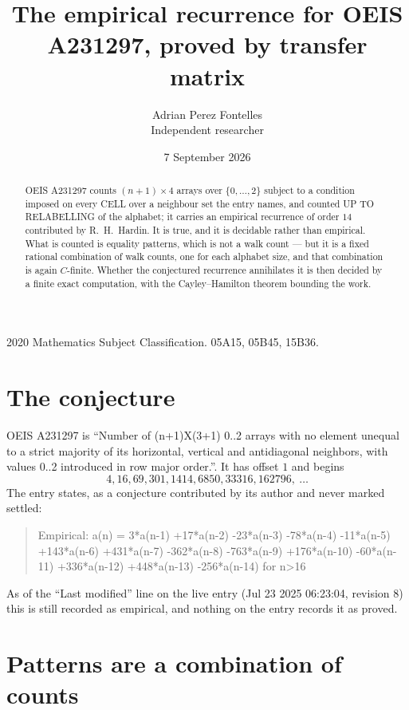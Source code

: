 \documentclass[11pt,a4paper]{article}
\title{The empirical recurrence for OEIS A231297, proved by transfer matrix}
\author{Adrian Perez Fontelles\\ \small Independent researcher}
\date{7 September 2026}
\theoremstyle{plain}
\theoremstyle{definition}
\begin{document}
\maketitle

\begin{abstract}
OEIS A231297 counts $(n+1)\times4$ arrays over $\{0,\dots,2\}$ subject to a condition imposed on
every CELL over a neighbour set the entry names, and counted UP TO RELABELLING of the
alphabet; it carries an empirical recurrence of order $14$ contributed by
R.~H.~Hardin. It is true, and it is decidable rather than empirical. What is counted is
equality patterns, which is not a walk count --- but it is a fixed rational combination of
walk counts, one for each alphabet size, and that combination is again $C$-finite. Whether the
conjectured recurrence annihilates it is then decided by a finite exact computation, with the
Cayley--Hamilton theorem bounding the work.
\end{abstract}

\noindent\small 2020 Mathematics Subject Classification. 05A15, 05B45, 15B36.\normalsize

\section{The conjecture}

OEIS A231297 is ``Number of (n+1)X(3+1) 0..2 arrays with no element unequal to a strict majority of its horizontal, vertical and antidiagonal neighbors, with values 0..2 introduced in row major order.''. It has offset $1$ and begins
\[
4, 16, 69, 301, 1414, 6850, 33316, 162796,\ \dots
\]
The entry states, as a conjecture contributed by its author and never marked settled:
\begin{quote}
Empirical: a(n) = 3*a(n-1) +17*a(n-2) -23*a(n-3) -78*a(n-4) -11*a(n-5) +143*a(n-6) +431*a(n-7) -362*a(n-8) -763*a(n-9) +176*a(n-10) -60*a(n-11) +336*a(n-12) +448*a(n-13) -256*a(n-14) for n>16
\end{quote}
As of the ``Last modified'' line on the live entry (Jul 23 2025 06:23:04, revision 8) this is still
recorded as empirical, and nothing on the entry records it as proved.

\section{Patterns are a combination of counts}
\end{document}
